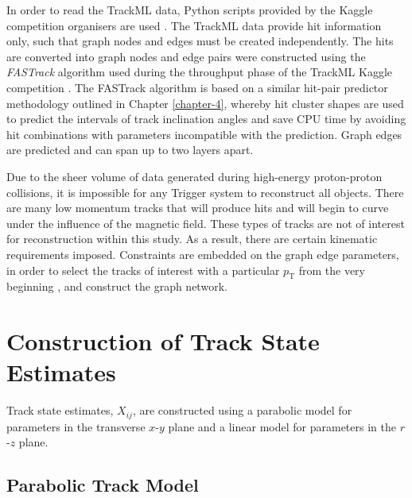 In order to read the TrackML data, Python scripts provided by the Kaggle competition organisers are used \cite{python-scripts-kaggle}. The TrackML data provide hit information only, such that graph nodes and edges must be created independently. The hits are converted into graph nodes and edge pairs were constructed using the \textit{FASTrack} algorithm used during the throughput phase of the TrackML Kaggle competition \cite{Amrouche2023}. The FASTrack algorithm is based on a similar hit-pair predictor methodology outlined in Chapter \ref{chapter-4}, whereby hit cluster shapes are used to predict the intervals of track inclination angles and save CPU time by avoiding hit combinations with parameters incompatible with the prediction. Graph edges are predicted and can span up to two layers apart.

Due to the sheer volume of data generated during high-energy proton-proton collisions, it is impossible for any Trigger system to reconstruct all objects. There are many low momentum tracks that will produce hits and will begin to curve under the influence of the magnetic field. These types of tracks are not of interest for reconstruction within this study. As a result, there are certain kinematic requirements imposed. Constraints are embedded on the graph edge parameters, in order to select the tracks of interest with a particular $p_{\text{T}}$ from the very beginning \cite{Dmitry-fasttrack-addtest}, and construct the graph network. 



\section{Construction of Track State Estimates}
\label{constructing-track-states}

Track state estimates, $X_{ij}$, are constructed using a parabolic model for parameters in the transverse $x$-$y$ plane and a linear model for parameters in the $r$-$z$ plane.



\subsection{Parabolic Track Model}
\label{parabolic-state}

